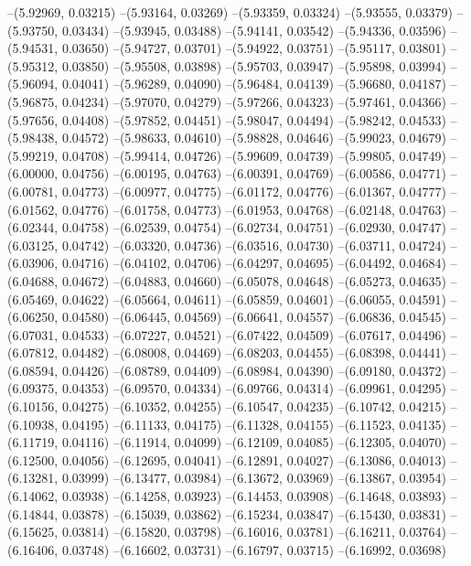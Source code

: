 --(5.92969, 0.03215)
--(5.93164, 0.03269)
--(5.93359, 0.03324)
--(5.93555, 0.03379)
--(5.93750, 0.03434)
--(5.93945, 0.03488)
--(5.94141, 0.03542)
--(5.94336, 0.03596)
--(5.94531, 0.03650)
--(5.94727, 0.03701)
--(5.94922, 0.03751)
--(5.95117, 0.03801)
--(5.95312, 0.03850)
--(5.95508, 0.03898)
--(5.95703, 0.03947)
--(5.95898, 0.03994)
--(5.96094, 0.04041)
--(5.96289, 0.04090)
--(5.96484, 0.04139)
--(5.96680, 0.04187)
--(5.96875, 0.04234)
--(5.97070, 0.04279)
--(5.97266, 0.04323)
--(5.97461, 0.04366)
--(5.97656, 0.04408)
--(5.97852, 0.04451)
--(5.98047, 0.04494)
--(5.98242, 0.04533)
--(5.98438, 0.04572)
--(5.98633, 0.04610)
--(5.98828, 0.04646)
--(5.99023, 0.04679)
--(5.99219, 0.04708)
--(5.99414, 0.04726)
--(5.99609, 0.04739)
--(5.99805, 0.04749)
--(6.00000, 0.04756)
--(6.00195, 0.04763)
--(6.00391, 0.04769)
--(6.00586, 0.04771)
--(6.00781, 0.04773)
--(6.00977, 0.04775)
--(6.01172, 0.04776)
--(6.01367, 0.04777)
--(6.01562, 0.04776)
--(6.01758, 0.04773)
--(6.01953, 0.04768)
--(6.02148, 0.04763)
--(6.02344, 0.04758)
--(6.02539, 0.04754)
--(6.02734, 0.04751)
--(6.02930, 0.04747)
--(6.03125, 0.04742)
--(6.03320, 0.04736)
--(6.03516, 0.04730)
--(6.03711, 0.04724)
--(6.03906, 0.04716)
--(6.04102, 0.04706)
--(6.04297, 0.04695)
--(6.04492, 0.04684)
--(6.04688, 0.04672)
--(6.04883, 0.04660)
--(6.05078, 0.04648)
--(6.05273, 0.04635)
--(6.05469, 0.04622)
--(6.05664, 0.04611)
--(6.05859, 0.04601)
--(6.06055, 0.04591)
--(6.06250, 0.04580)
--(6.06445, 0.04569)
--(6.06641, 0.04557)
--(6.06836, 0.04545)
--(6.07031, 0.04533)
--(6.07227, 0.04521)
--(6.07422, 0.04509)
--(6.07617, 0.04496)
--(6.07812, 0.04482)
--(6.08008, 0.04469)
--(6.08203, 0.04455)
--(6.08398, 0.04441)
--(6.08594, 0.04426)
--(6.08789, 0.04409)
--(6.08984, 0.04390)
--(6.09180, 0.04372)
--(6.09375, 0.04353)
--(6.09570, 0.04334)
--(6.09766, 0.04314)
--(6.09961, 0.04295)
--(6.10156, 0.04275)
--(6.10352, 0.04255)
--(6.10547, 0.04235)
--(6.10742, 0.04215)
--(6.10938, 0.04195)
--(6.11133, 0.04175)
--(6.11328, 0.04155)
--(6.11523, 0.04135)
--(6.11719, 0.04116)
--(6.11914, 0.04099)
--(6.12109, 0.04085)
--(6.12305, 0.04070)
--(6.12500, 0.04056)
--(6.12695, 0.04041)
--(6.12891, 0.04027)
--(6.13086, 0.04013)
--(6.13281, 0.03999)
--(6.13477, 0.03984)
--(6.13672, 0.03969)
--(6.13867, 0.03954)
--(6.14062, 0.03938)
--(6.14258, 0.03923)
--(6.14453, 0.03908)
--(6.14648, 0.03893)
--(6.14844, 0.03878)
--(6.15039, 0.03862)
--(6.15234, 0.03847)
--(6.15430, 0.03831)
--(6.15625, 0.03814)
--(6.15820, 0.03798)
--(6.16016, 0.03781)
--(6.16211, 0.03764)
--(6.16406, 0.03748)
--(6.16602, 0.03731)
--(6.16797, 0.03715)
--(6.16992, 0.03698)
